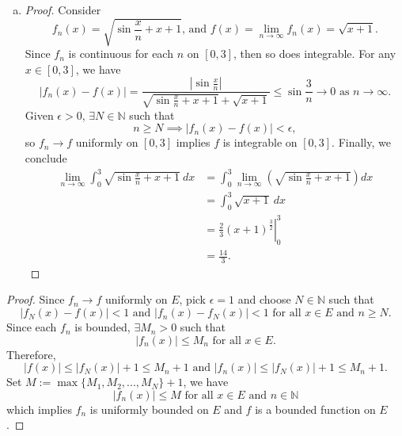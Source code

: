 \documentclass{report}
\begin{document}
\begin{Exercise}
\begin{enumerate}[a)]
\item
\begin{proof}
Consider $$f_n(x) = \sqrt{\sin{\frac{x}{n}}+x+1}\text{, and } f(x)=\lim_{n\to\infty}f_n(x) = \sqrt{x+1}.$$
Since $f_n$ is continuous for each $n$ on $[0,3]$, then so does integrable.
For any $x\in[0, 3]$, we have $$ \left| f_n(x) - f(x) \right| =
\frac{\left| \sin{ \frac{x}{n} } \right| }{  \sqrt{ \sin{ \frac{x}{n} }+x+1} + \sqrt{x+1}} \leq
\sin{\frac{3}{n}}\to 0 \mbox{ as }n\to\infty.$$
Given $\epsilon > 0$, $\exists N\in\mathbb{N}$ such that $$n \geq N \implies \left| f_n(x) - f(x) \right| < \epsilon,$$
so $f_n \to f$ uniformly on $[0,3]$ implies $f$ is integrable on $[0,3]$. Finally, we conclude
\begin{align*}
\lim_{n\to\infty}\int_{0}^{3} \sqrt{\sin{\frac{x}{n}}+x+1}\ dx
&= \int_{0}^{3} \lim_{n\to\infty}\left( \sqrt{\sin{\frac{x}{n}}+x+1} \right) dx \\
&= \int_{0}^{3} \sqrt{x+1}\ dx \\
&= \left. \frac{2}{3} \left( x+1 \right)^{ \frac{3}{2} } \right|_{0}^{3} \\
&= \frac{14}{3}.
\end{align*}
\end{proof}
\end{enumerate}
\end{Exercise}

\vspace{12pt}
\begin{Exercise}
\begin{proof}
Since $f_n\to f$ uniformly on $E$, pick $\epsilon = 1$ and choose $N\in\mathbb{N}$ such that $$ \left| f_N(x)-f(x) \right|<1\text{ and } \left| f_n(x)-f_N(x) \right|<1 \mbox{ for all } x\in E\text{ and } n\geq N.$$
Since each $f_n$ is bounded, $\exists M_n>0$ such that $$\left|f_n(x)\right|\leq M_n \mbox{ for all } x\in E.$$
Therefore, $$\left| f(x) \right| \leq \left| f_N(x) \right| +1\leq M_n+1\text{ and } \left|f_n(x)\right| \leq \left|f_N(x)\right|+1\leq M_n+1.$$
Set $M := \max\{M_1, M_2, ..., M_N\}+1$, we have $$\left| f_n(x) \right| \leq M\mbox{ for all } x\in E\text{ and } n\in\mathbb{N}$$
which implies ${f_n}$ is uniformly bounded on $E$ and $f$ is a bounded function on $E$.
\end{proof}
\end{Exercise}
\end{document}
